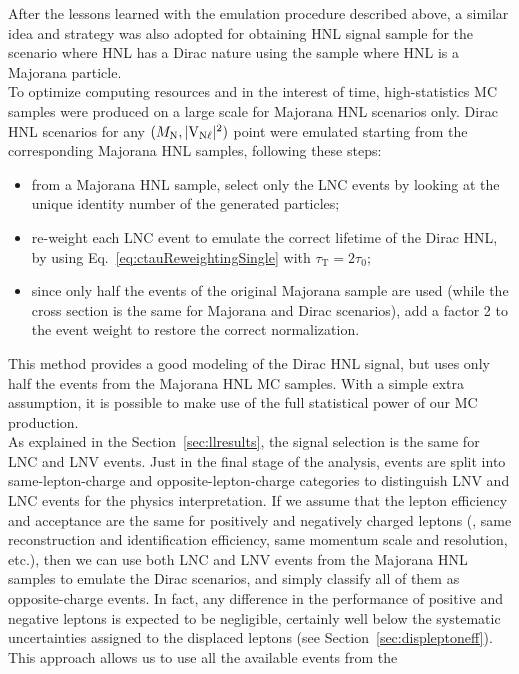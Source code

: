 After the lessons learned with the emulation procedure described 
above, a similar idea and strategy
was also adopted for obtaining HNL signal sample for the scenario where HNL has a Dirac nature using the sample where HNL is a Majorana particle.\\
To optimize computing resources and in the interest of time,
high-statistics MC samples were produced on a large scale for Majorana
HNL scenarios only.
Dirac HNL scenarios for any $(M_{\mathrm{N}},\mathrm{|V_{\mathrm{N}\ell}|^2})$ point were emulated
starting from the corresponding Majorana HNL samples, following these
steps:
\begin{itemize}
\setlength\itemsep{-0.2em}
\item from a Majorana HNL sample, select only the LNC events by
  looking at the unique identity number of the generated particles;
\item re-weight each LNC event to emulate the correct lifetime of the
  Dirac HNL, by using Eq.~\ref{eq:ctauReweightingSingle} with
  $\tau_{\mathrm{T}}=2\tau_0$;
\item since only half the events of the original Majorana sample are
  used (while the cross section is the same for Majorana and Dirac
  scenarios), add a factor 2 to the event weight to restore the correct
  normalization.
\end{itemize}
This method provides a good modeling of the Dirac HNL signal, but
uses only half the events from the Majorana HNL MC samples. With a
simple extra assumption, it is possible to make use of the full
statistical power of our MC production.\\
As explained in the Section~\ref{sec:llresults}, the signal selection is the
same for LNC and LNV events. Just in the final stage of the analysis,
events are split into same-lepton-charge and opposite-lepton-charge
categories to distinguish LNV and LNC events for the physics
interpretation. If we assume that the lepton efficiency and
acceptance are the same for positively and negatively charged leptons
(\ie, same reconstruction and identification efficiency, same momentum
scale and resolution, etc.), then we can use both LNC and LNV events
from the Majorana HNL samples to emulate the Dirac scenarios, and
simply classify all of them as opposite-charge events. In fact, any
difference in the performance of positive and negative leptons is
expected to be negligible, certainly well below the systematic
uncertainties assigned to the displaced leptons (see
Section~\ref{sec:displeptoneff}).
This approach allows us to use all the available events from the
